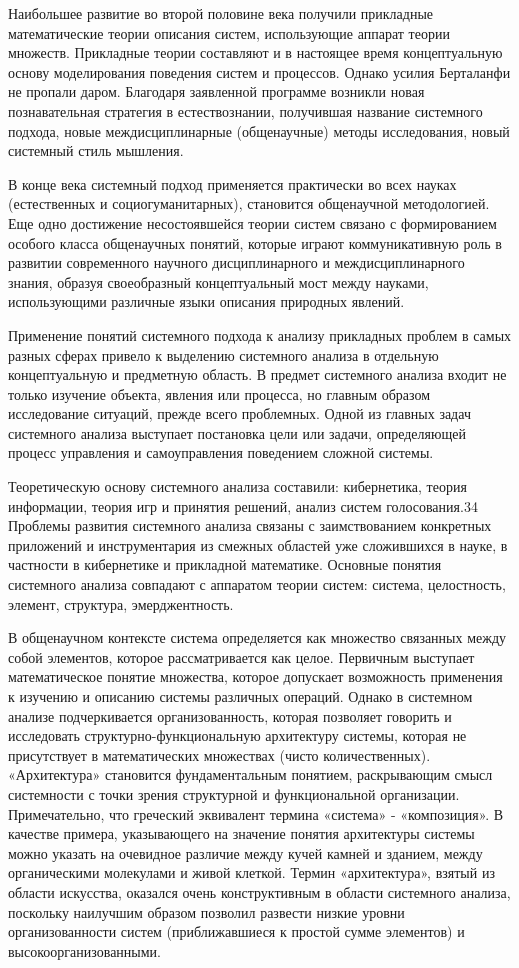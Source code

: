 \documentclass[exam_answers.tex]{subfiles}
\begin{document}
Наибольшее развитие во второй половине века получили прикладные
математические теории описания систем, использующие аппарат теории
множеств. Прикладные теории составляют и в настоящее время
концептуальную основу моделирования поведения систем и процессов. Однако
усилия Берталанфи не пропали даром. Благодаря заявленной программе
возникли новая познавательная стратегия в естествознании, получившая
название системного подхода, новые междисциплинарные (общенаучные)
методы исследования, новый системный стиль мышления.

В конце века системный подход применяется практически во всех науках
(естественных и социогуманитарных), становится общенаучной методологией.
Еще одно достижение несостоявшейся теории систем связано с формированием
особого класса общенаучных понятий, которые играют коммуникативную роль
в развитии современного научного дисциплинарного и междисциплинарного
знания, образуя своеобразный концептуальный мост между науками,
использующими различные языки описания природных явлений.

Применение понятий системного подхода к анализу прикладных проблем в
самых разных сферах привело к выделению системного анализа в отдельную
концептуальную и предметную область. В предмет системного анализа входит
не только изучение объекта, явления или процесса, но главным образом
исследование ситуаций, прежде всего проблемных. Одной из главных задач
системного анализа выступает постановка цели или задачи, определяющей
процесс управления и самоуправления поведением сложной системы.

Теоретическую основу системного анализа составили: кибернетика, теория
информации, теория игр и принятия решений, анализ систем голосования.34
Проблемы развития системного анализа связаны с заимствованием конкретных
приложений и инструментария из смежных областей уже сложившихся в науке,
в частности в кибернетике и прикладной математике. Основные понятия
системного анализа совпадают с аппаратом теории систем: система,
целостность, элемент, структура, эмерджентность.

В общенаучном контексте система определяется как множество связанных
между собой элементов, которое рассматривается как целое. Первичным
выступает математическое понятие множества, которое допускает возможность
применения к изучению и описанию системы различных операций. Однако в
системном анализе подчеркивается организованность, которая позволяет
говорить и исследовать структурно-функциональную архитектуру системы,
которая не присутствует в математических множествах (чисто
количественных). «Архитектура» становится фундаментальным понятием,
раскрывающим смысл системности с точки зрения структурной и
функциональной организации. Примечательно, что греческий эквивалент
термина «система» - «композиция». В качестве примера, указывающего на
значение понятия архитектуры системы можно указать на очевидное различие
между кучей камней и зданием, между органическими молекулами и живой
клеткой. Термин «архитектура», взятый из области искусства, оказался очень
конструктивным в области системного анализа, поскольку наилучшим образом
позволил развести низкие уровни организованности систем (приближавшиеся к
простой сумме элементов) и высокоорганизованными.
\end{document}
